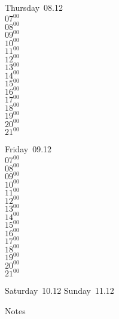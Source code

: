 \documentclass[11pt,a4paper]{book}\usepackage[]{graphicx}\usepackage[]{color}
\begin{document}
\clearpage
\begin{headerbox}
\end{headerbox}
\begin{weekdaybox}
  Thursday~08.12\\
  { 
  \vfill
  $07^{00}$\\
$08^{00}$\\
$09^{00}$\\
$10^{00}$\\
$11^{00}$\\
$12^{00}$\\
$13^{00}$\\
$14^{00}$\\
$15^{00}$\\
$16^{00}$\\
$17^{00}$\\
$18^{00}$\\
$19^{00}$\\
$20^{00}$\\
$21^{00}$\\
  }
\end{weekdaybox} 
\begin{weekdaybox}
  Friday~09.12\\
  { 
  \vfill
  $07^{00}$\\
$08^{00}$\\
$09^{00}$\\
$10^{00}$\\
$11^{00}$\\
$12^{00}$\\
$13^{00}$\\
$14^{00}$\\
$15^{00}$\\
$16^{00}$\\
$17^{00}$\\
$18^{00}$\\
$19^{00}$\\
$20^{00}$\\
$21^{00}$\\
  }
\end{weekdaybox}
\begin{weekendbox}
  Saturday~10.12
  \tcblower
  Sunday~11.12
\end{weekendbox} %
\begin{notebox}
  Notes
\end{notebox}
\clearpage
\end{document}
